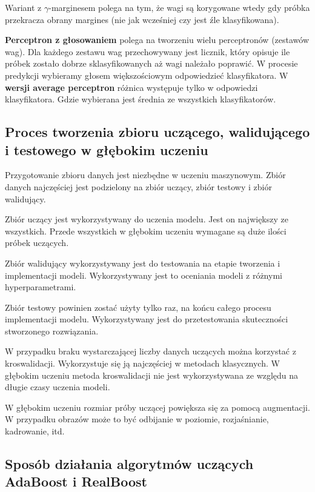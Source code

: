 \documentclass[wi]{zut}
\begin{document}
Wariant z $\gamma$-marginesem polega na tym, że wagi są korygowane wtedy gdy próbka przekracza obrany margines (nie jak wcześniej czy jest źle klasyfikowana).

\textbf{Perceptron z głosowaniem} polega na tworzeniu wielu perceptronów (zestawów wag). Dla każdego zestawu wag przechowywany jest licznik, który opisuje ile próbek zostało dobrze sklasyfikowanych aż wagi należało poprawić. W procesie predykcji wybieramy głosem większościowym odpowiedzieć klasyfikatora. W \textbf{wersji average perceptron} różnica występuje tylko w odpowiedzi klasyfikatora. Gdzie wybierana jest średnia ze wszystkich klasyfikatorów.
\question

\subsection{Proces tworzenia zbioru uczącego, walidującego i testowego w głębokim uczeniu}

Przygotowanie zbioru danych jest niezbędne w uczeniu maszynowym. Zbiór danych najczęściej jest podzielony na zbiór uczący, zbiór testowy i zbiór walidujący. 

Zbiór uczący jest wykorzystywany do uczenia modelu. Jest on największy ze wszystkich. Przede wszystkich w głębokim uczeniu wymagane są duże ilości próbek uczących.

Zbiór walidujący wykorzystywany jest do testowania na etapie tworzenia i implementacji modeli. Wykorzystywany jest to oceniania modeli z różnymi hyperparametrami. 

Zbiór testowy powinien zostać użyty tylko raz, na końcu całego procesu implementacji modelu. Wykorzystywany jest do przetestowania skuteczności stworzonego rozwiązania. 

W przypadku braku wystarczającej liczby danych uczących można korzystać z kroswalidacji. Wykorzystuje się ją najczęściej w metodach klasycznych. W głębokim uczeniu metoda kroswalidacji nie jest wykorzystywana ze względu na długie czasy uczenia modeli.

W głębokim uczeniu rozmiar próby uczącej powiększa się za pomocą augmentacji. W przypadku obrazów może to być odbijanie w poziomie, rozjaśnianie, kadrowanie, itd.

\subsection{Sposób działania algorytmów uczących AdaBoost i RealBoost}
\end{document}
